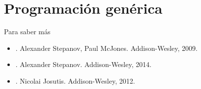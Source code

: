 \section{Programación genérica}




%

\begin{frame}[t]{Para saber más}
\begin{itemize}
  \item {}.
  Alexander Stepanov, Paul McJones.
  Addison-Wesley, 2009.

  \vfill

  \item {}.
  Alexander Stepanov.
  Addison-Wesley, 2014.

  \vfill

  \item {}.
  Nicolai Josutis.
  Addison-Wesley, 2012.
\end{itemize}
\end{frame}
